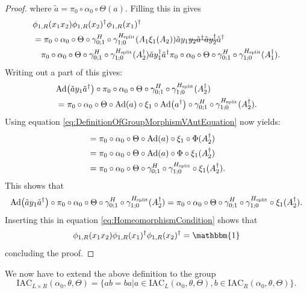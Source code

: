 \documentclass[12pt,a4paper,twoside]{article}
\newcommand{\stkout}[1]{\ifmmode\text{\sout{\ensuremath{#1}}}\else\sout{#1}\fi}
\newcommand{\IAC}{\textrm{IAC}}
\let\originalleft\left
\let\originalright\right
\renewcommand{\left}{\mathopen{}\mathclose\bgroup\originalleft}
\renewcommand{\right}{\aftergroup\egroup\originalright}
\newcommand{\id}{\mathbbm{1}}
\newcommand{\Ad}[1]{\textrm{Ad}\left(#1\right)}
\theoremstyle{definition}
\numberwithin{equation}{section}
\begin{document}
\begin{proof}
	where $\tilde{a}=\pi_0\circ\alpha_0\circ\Theta(a)$. Filling this in gives
	\begin{align}
		&\phi_{1,R}(x_1x_2)\phi_{1,R}(x_2)^\dagger\phi_{1,R}(x_1)^\dagger\\
		\label{eq:HomeomorphismCondition}
		&=\pi_0\circ\alpha_0\circ\Theta\circ\gamma^H_{0;1}\circ\gamma^{H_\text{split}}_{1;0}(A_1\xi_1(A_2))\tilde{a}y_1\stkout{y_2\tilde{a}^\dagger \tilde{a}y_2^\dagger}\tilde{a}^\dagger\\
		\nonumber
		&\quad\pi_0\circ\alpha_0\circ\Theta\circ\gamma^H_{0;1}\circ\gamma^{H_\text{split}}_{1;0}(A_2^\dagger)\tilde{a}y_1^\dagger\tilde{a}^\dagger \pi_0\circ\alpha_0\circ\Theta\circ\gamma^H_{0;1}\circ\gamma^{H_\text{split}}_{1;0}(A_1^\dagger).
	\end{align}
	Writing out a part of this gives:
	\begin{align}
		&\Ad{\tilde{a}y_1\tilde{a}^\dagger}\circ\pi_0\circ\alpha_0\circ\Theta\circ\gamma^H_{0;1}\circ\gamma^{H_\text{split}}_{1;0}(A_2^\dagger)\\
		&=\pi_0\circ\alpha_0\circ\Theta\circ\Ad{a}\circ\xi_1\circ\Ad{a^\dagger}\circ\gamma^H_{0;1}\circ\gamma^{H_\text{split}}_{1;0}(A_2^\dagger).
	\end{align}
	Using equation \eqref{eq:DefinitionOfGroupMorphismVAutEquation} now yields:
	\begin{align}
		&=\pi_0\circ\alpha_0\circ\Theta\circ\Ad{a}\circ\xi_1\circ\Phi(A_2^\dagger)\\
		&=\pi_0\circ\alpha_0\circ\Theta\circ\Ad{a}\circ\Phi\circ\xi_1(A_2^\dagger)\\
		&=\pi_0\circ\alpha_0\circ\Theta\circ\gamma^H_{0;1}\circ\gamma^{H_\text{split}}_{1;0}\circ\xi_1(A_2^\dagger).
	\end{align}
	This shows that
	\begin{equation}
		\Ad{\tilde{a}y_1\tilde{a}^\dagger}\circ\pi_0\circ\alpha_0\circ\Theta\circ\gamma^H_{0;1}\circ\gamma^{H_\text{split}}_{1;0}(A_2^\dagger)=\pi_0\circ\alpha_0\circ\Theta\circ\gamma^H_{0;1}\circ\gamma^{H_\text{split}}_{1;0}\circ\xi_1(A_2^\dagger).
	\end{equation}
	Inserting this in equation \eqref{eq:HomeomorphismCondition} shows that
	\begin{equation}
		\phi_{1,R}(x_1x_2)\phi_{1,R}(x_1)^\dagger\phi_{1,R}(x_2)^\dagger=\id
	\end{equation}
	concluding the proof.
\end{proof}
We now have to extend the above definition to the group
\begin{equation}
	\IAC_{L\times R}(\alpha_0,\theta,\Theta)=\{ab=ba|a\in\IAC_{L}(\alpha_0,\theta,\Theta),b\in\IAC_{R}(\alpha_0,\theta,\Theta)\}.
\end{equation}
\end{document}
